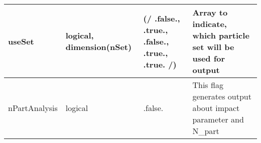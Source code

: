 \documentclass{article}
\begin{document}
\begin{longtable}{llll}
\midrule
useSet & \begin{minipage}[t]{2cm}logical, dimension(nSet)\end{minipage} & \begin{minipage}[t]{2cm}(/ .false., .true., .false., .true., .true. /)\end{minipage} & \begin{minipage}[t]{12cm}Array to indicate, which particle set will be used for output\end{minipage}\\*
\midrule
nPartAnalysis & \begin{minipage}[t]{2cm}logical\end{minipage} & \begin{minipage}[t]{2cm}.false.\end{minipage} & \begin{minipage}[t]{12cm}This flag generates output about impact parameter and N\_part\end{minipage}\\*
\bottomrule
\end{longtable}
{ }



\end{document}
